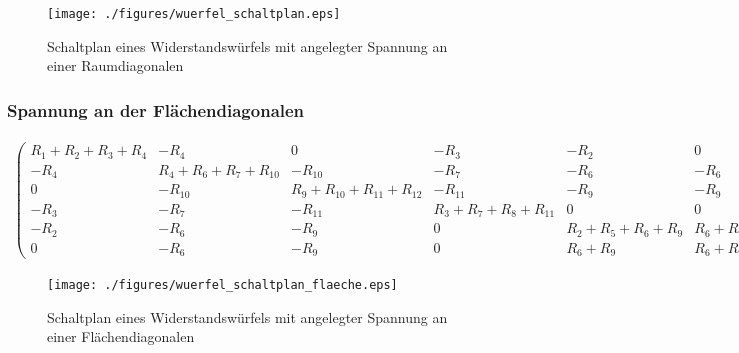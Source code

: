 \documentclass[10pt,a4paper]{article}
\begin{document}
\begin{landscape}
\begin{figure}[htbp!]
\centering
\texttt{[image: ./figures/wuerfel\_schaltplan.eps]}
\caption{Schaltplan eines Widerstandswürfels mit angelegter Spannung an einer Raumdiagonalen}
\label{fig:wuerfel_schaltplan}
\end{figure}

\subsubsection{Spannung an der Flächendiagonalen}
\thispagestyle{empty}
\begin{align}
\begin{pmatrix}
R_1+R_2+R_3+R_4 &  -R_4  &  0  &  -R_3  &  -R_2  &  0  \\ 
-R_4 & R_4+R_6+R_7+R_{10} & -R_{10} & -R_7 & -R_6 & -R_6 \\ 
 0  & -R_{10} & R_9+R_{10}+R_{11}+R_{12} & -R_{11} & -R_9 & -R_9 \\ 
-R_3 & -R_7 & -R_11 & R_3+R_7+R_8+R_{11} & 0 & 0 \\ 
-R_2 & -R_6 & -R_9 & 0 & R_2+R_5+R_6+R_9 & R_6+R_9 \\ 
 0  & -R_6 & -R_9 &  0  & R_6+R_9 & R_6+R_9
\end{pmatrix}
\begin{pmatrix}
I_1\\I_2\\I_3\\I_4\\I_5\\I_{ges}
\end{pmatrix}
=
\begin{pmatrix}
0\\0\\0\\0\\0\\U
\end{pmatrix}
\label{eqn:wuerfel_flaeche}
\end{align}

\begin{figure}[htbp!]
\centering
\texttt{[image: ./figures/wuerfel\_schaltplan\_flaeche.eps]}
\caption{Schaltplan eines Widerstandswürfels mit angelegter Spannung an einer Flächendiagonalen}
\label{fig:wuerfel_schaltplan_flaeche}
\end{figure}


\end{landscape}
\end{document}

